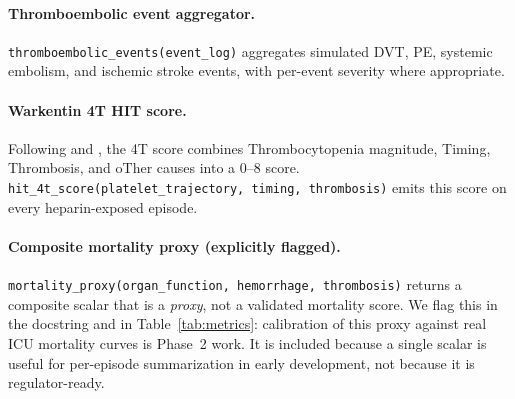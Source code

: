 \documentclass[11pt]{article}
\begin{document}
\paragraph{Thromboembolic event aggregator.}
\texttt{thromboembolic\_events(event\_log)} aggregates simulated DVT, PE, systemic embolism, and ischemic stroke events, with per-event severity where appropriate.

\paragraph{Warkentin 4T HIT score.}
Following \citet{warkentin2003} and \citet{lo2006}, the 4T score combines Thrombocytopenia magnitude, Timing, Thrombosis, and oTher causes into a 0--8 score. \texttt{hit\_4t\_score(platelet\_trajectory, timing, thrombosis)} emits this score on every heparin-exposed episode.

\paragraph{Composite mortality proxy (explicitly flagged).}
\texttt{mortality\_proxy(organ\_function, hemorrhage, thrombosis)} returns a composite scalar that is a \emph{proxy}, not a validated mortality score. We flag this in the docstring and in Table~\ref{tab:metrics}: calibration of this proxy against real ICU mortality curves is Phase~2 work. It is included because a single scalar is useful for per-episode summarization in early development, not because it is regulator-ready.

\begin{table}[ht]
\centering
\caption{Clinical-outcome metrics emitted by every \texttt{hemosim} environment.}
\label{tab:metrics}
\end{table}
\end{document}
